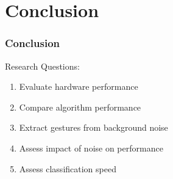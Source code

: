 \documentclass[xcolor={svgnames,table},10pt,fleqn]{beamer}
\begin{document}
\section{Conclusion}
\begin{frame}
    \frametitle{Conclusion}
    Research Questions:
    \begin{enumerate}
        \item Evaluate hardware performance
        \item Compare algorithm performance
        \item Extract gestures from background noise
        \item Assess impact of noise on performance
        \item Assess classification speed
    \end{enumerate}
\end{frame}
\end{document}
